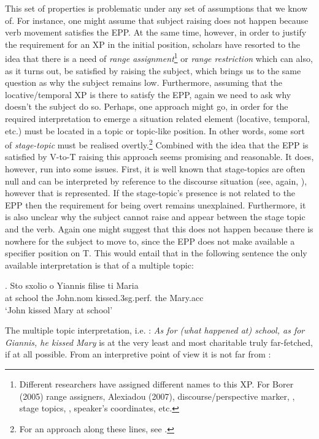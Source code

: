 \documentclass[11pt]{article}
\begin{document}
This set of properties is problematic under any set of assumptions that we know of.  For instance, one might assume that subject raising does not happen because verb movement satisfies the EPP.  At the same time, however, in order to justify the requirement for an XP in the initial position, scholars have resorted to the idea that there is a need of \textit{range assignment}\footnote{Different researchers have assigned different names to this XP. For Borer (2005) range assigners, Alexiadou (2007), discourse/perspective marker, \citet{cohen-erteschik-shir:02}, stage topics, \citet{giorgi:10}, speaker's coordinates,  etc.}  or \textit{range restriction} which can also, as it turns out, be satisfied by raising the subject, which brings us to the same question as why the subject remains low.  Furthermore, assuming that the locative/temporal XP is there to satisfy the EPP, again we need to ask why doesn't the subject do so. Perhaps, one approach might go, in order for the required interpretation to emerge a situation related element (locative, temporal, etc.) must be located in a topic or topic-like position.  In other words, some sort of \textit{stage-topic} must be realised overtly.\footnote{For an approach along these lines, see \citet{basilico:03}.}  Combined with the idea that the EPP is satisfied by V-to-T raising this approach seems promising and reasonable.  It does, however, run into some issues.  First, it is well known that stage-topics are often null and can be interpreted by reference to the discourse situation (see, again, \citet{basilico:03}), however that is represented.  If the stage-topic's presence is not related to the EPP then the requirement for being overt remains unexplained.  Furthermore, it is also unclear why the subject cannot raise and appear between the stage topic and the verb.  Again one might suggest that this does not happen because there is nowhere for the subject to move to, since the EPP does not make available a specifier position on T.  This would entail that in the following sentence the only available interpretation is that of a multiple topic:

\ex.
Sto sxolio o Yiannis filise ti Maria\\
at school the John.nom kissed.3sg.perf. the Mary.acc\\
`John kissed Mary at school'



The multiple topic interpretation, i.e. : \textit{As for (what happened at) school, as for Giannis, he kissed Mary} is at the very least and most charitable truly far-fetched, if at all possible.  From an interpretive point of view it is not far from :
\end{document}
